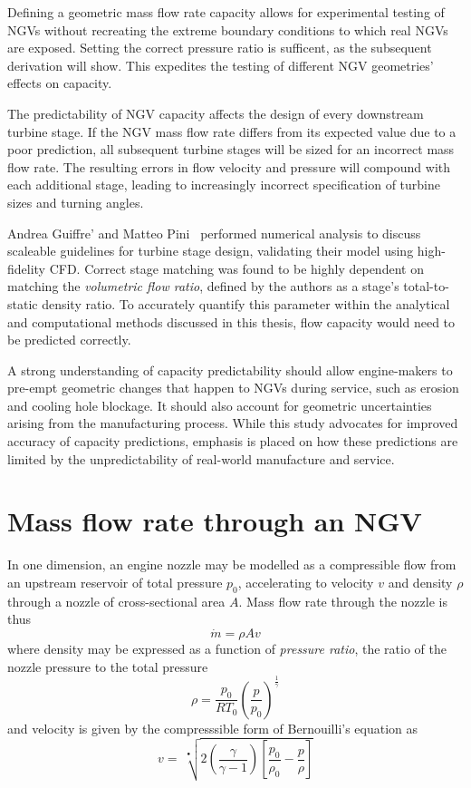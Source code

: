 \documentclass[a4paper, 11pt, twoside]{report}
\begin{document}
Defining a geometric mass flow rate capacity allows for experimental testing of NGVs without recreating the extreme boundary conditions to which real NGVs are exposed. Setting the correct pressure ratio is sufficent, as the subsequent derivation will show. This expedites the testing of different NGV geometries' effects on capacity.

The predictability of NGV capacity affects the design of every downstream turbine stage. If the NGV mass flow rate differs from its expected value due to a poor prediction, all subsequent turbine stages will be sized for an incorrect mass flow rate. The resulting errors in flow velocity and pressure will compound with each additional stage, leading to increasingly incorrect specification of turbine sizes and turning angles.

Andrea Guiffre' and Matteo Pini~\cite{guiffre_design_guidelines} performed numerical analysis to discuss scaleable guidelines for turbine stage design, validating their model using high-fidelity CFD.  Correct stage matching was found to be highly dependent on matching the \textit{volumetric flow ratio}, defined by the authors as a stage's total-to-static density ratio. To accurately quantify this parameter within the analytical and computational methods discussed in this thesis, flow capacity would need to be predicted correctly.

A strong understanding of capacity predictability should allow engine-makers to pre-empt geometric changes that happen to NGVs during service, such as erosion and cooling hole blockage. It should also account for geometric uncertainties arising from the manufacturing process. While this study advocates for improved accuracy of capacity predictions, emphasis is placed on how these predictions are limited by the unpredictability of real-world manufacture and service.


\section{Mass flow rate through an NGV}

In one dimension, an engine nozzle may be modelled as a compressible flow from an upstream reservoir of total pressure $p_0$, accelerating to velocity $v$ and density $\rho$ through a nozzle of cross-sectional area $A$. Mass flow rate through the nozzle is thus
\begin{equation}
\dot{m} = \rho A v
\end{equation}
where density may be expressed as a function of \textit{pressure ratio}, the ratio of the nozzle pressure to the total pressure
\begin{equation}
\rho = \frac{p_0}{R T_0} \left(\frac{p}{p_0}\right)^\frac{1}{\gamma}
\end{equation}
and velocity is given by the compresssible form of Bernouilli's equation as
\begin{equation}
v = \>
\sqrt[•]{ 
	2 \left( \frac{\gamma}{\gamma - 1} \right) \left[ \frac{p_0}{\rho_0} - \frac{p}{\rho} \right] 
}
\end{equation}
\end{document}
